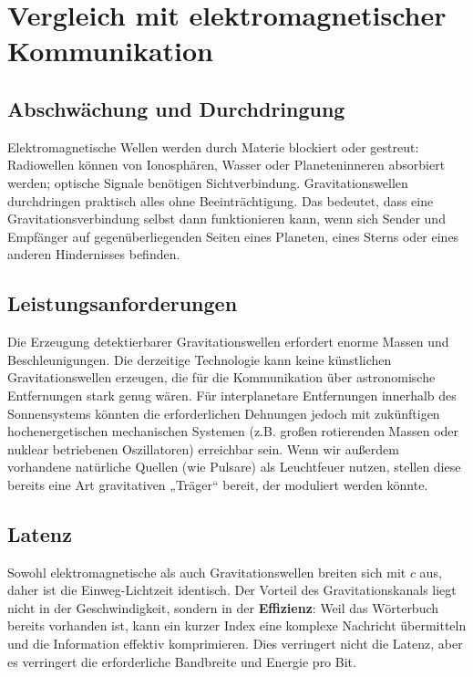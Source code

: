 \documentclass[12pt,a4paper]{article}
\begin{document}
	\section{Vergleich mit elektromagnetischer Kommunikation}
	\label{sec:comparison}
	
	\subsection{Abschwächung und Durchdringung}
	
	Elektromagnetische Wellen werden durch Materie blockiert oder gestreut: Radiowellen können von Ionosphären, Wasser oder Planeteninneren absorbiert werden; optische Signale benötigen Sichtverbindung. Gravitationswellen durchdringen praktisch alles ohne Beeinträchtigung. Das bedeutet, dass eine Gravitationsverbindung selbst dann funktionieren kann, wenn sich Sender und Empfänger auf gegenüberliegenden Seiten eines Planeten, eines Sterns oder eines anderen Hindernisses befinden.
	
	\subsection{Leistungsanforderungen}
	
	Die Erzeugung detektierbarer Gravitationswellen erfordert enorme Massen und Beschleunigungen. Die derzeitige Technologie kann keine künstlichen Gravitationswellen erzeugen, die für die Kommunikation über astronomische Entfernungen stark genug wären. Für interplanetare Entfernungen innerhalb des Sonnensystems könnten die erforderlichen Dehnungen jedoch mit zukünftigen hochenergetischen mechanischen Systemen (z.B. großen rotierenden Massen oder nuklear betriebenen Oszillatoren) erreichbar sein. Wenn wir außerdem vorhandene natürliche Quellen (wie Pulsare) als Leuchtfeuer nutzen, stellen diese bereits eine Art gravitativen „Träger“ bereit, der moduliert werden könnte.
	
	\subsection{Latenz}
	
	Sowohl elektromagnetische als auch Gravitationswellen breiten sich mit \(c\) aus, daher ist die Einweg-Lichtzeit identisch. Der Vorteil des Gravitationskanals liegt nicht in der Geschwindigkeit, sondern in der \textbf{Effizienz}: Weil das Wörterbuch bereits vorhanden ist, kann ein kurzer Index eine komplexe Nachricht übermitteln und die Information effektiv komprimieren. Dies verringert nicht die Latenz, aber es verringert die erforderliche Bandbreite und Energie pro Bit.
	
\end{document}
